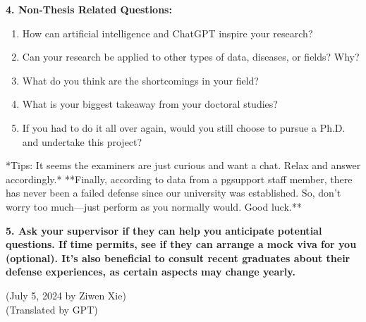 \textbf{4. Non-Thesis Related Questions:}
\begin{enumerate}
    \item How can artificial intelligence and ChatGPT inspire your research?
    \item Can your research be applied to other types of data, diseases, or fields? Why?
    \item What do you think are the shortcomings in your field?
    \item What is your biggest takeaway from your doctoral studies?
    \item If you had to do it all over again, would you still choose to pursue a Ph.D. and undertake this project?
\end{enumerate}
*Tips: It seems the examiners are just curious and want a chat. Relax and answer accordingly.* **Finally, according to data from a pgsupport staff member, there has never been a failed defense since our university was established. So, don't worry too much—just perform as you normally would. Good luck.**

\textbf{5. Ask your supervisor if they can help you anticipate potential questions. If time permits, see if they can arrange a mock viva for you (optional). It's also beneficial to consult recent graduates about their defense experiences, as certain aspects may change yearly.}

\begin{flushright}
    (July 5, 2024 by Ziwen Xie) \\
    (Translated by GPT)
\end{flushright}
